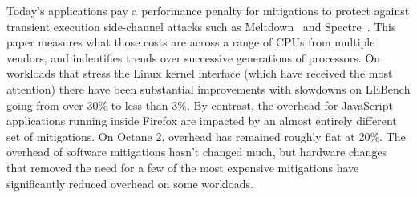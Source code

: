 
Today's applications pay a performance penalty for mitigations to
protect against transient execution side-channel attacks such as
Meltdown~\cite{lipp:meltdown} and Spectre~\cite{kocher:spectre}.
This paper measures what those costs are across a range of CPUs from multiple vendors, and indentifies trends over successive generations of processors.
On workloads that stress the Linux kernel interface (which have received the most attention) there have been substantial improvements with slowdowns on LEBench going from over 30\% to less than 3\%.
By contrast, the overhead for JavaScript applications running inside
Firefox are impacted by an almost entirely different set of
mitigations.
On Octane 2, overhead has remained roughly flat at 20\%.
The overhead of software mitigations hasn't changed much,
but hardware changes that removed the need for a
few of the most expensive mitigations have significantly reduced overhead on some workloads.
